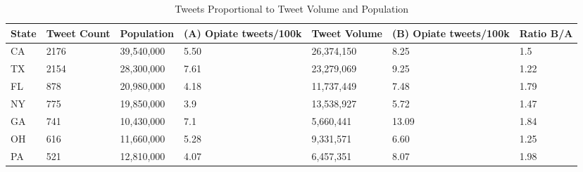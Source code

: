 \documentclass[sigconf]{acmart}
\begin{document}
\begin{table}[ht]
\centering
\caption{Tweets Proportional to Tweet Volume and Population}
\label{tab:1}
  \begin{tabular}{lllllll}
    \toprule
    State & Tweet Count & Population & (A) Opiate tweets/100k & Tweet Volume & 
    (B) Opiate tweets/100k & Ratio B/A \\
    \midrule     
    CA& 2176& 39,540,000& 5.50& 26,374,150& 8.25& 1.5 \\
    TX& 2154& 28,300,000& 7.61& 23,279,069& 9.25& 1.22 \\
    FL& 878& 20,980,000& 4.18& 11,737,449& 7.48& 1.79 \\
    NY& 775& 19,850,000& 3.9& 13,538,927& 5.72& 1.47 \\
    GA& 741& 10,430,000& 7.1& 5,660,441& 13.09& 1.84 \\
    OH& 616& 11,660,000& 5.28& 9,331,571& 6.60 & 1.25 \\
    PA& 521& 12,810,000& 4.07& 6,457,351& 8.07& 1.98 \\	
    \bottomrule
  \end{tabular}
\end{table}





%
\end{document}
